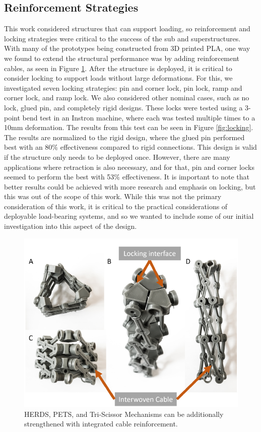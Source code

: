 \documentclass[11pt, a4paper]{article}
\begin{document}
\subsection{Reinforcement Strategies}
This work considered structures that can support loading, so reinforcement and locking strategies were critical to the success of the sub and superstructures. With many of the prototypes being constructed from 3D printed PLA, one way we found to extend the structural performance was by adding reinforcement cables, as seen in Figure \ref{fig:cable-reinforcing}. After the structure is deployed, it is critical to consider locking to support loads without large deformations. For this, we investigated seven locking strategies: pin and corner lock, pin lock, ramp and corner lock, and ramp lock. We also considered other nominal cases, such as no lock, glued pin, and completely rigid designs. These locks were tested using a 3-point bend test in an Instron machine, where each was tested multiple times to a 10mm deformation. The results from this test can be seen in Figure \ref{fig:locking}. The results are normalized to the rigid design, where the glued pin performed best with an 80\% effectiveness compared to rigid connections. This design is valid if the structure only needs to be deployed once. However, there are many applications where retraction is also necessary, and for that, pin and corner locks seemed to perform the best with 53\% effectiveness. It is important to note that better results could be achieved with more research and emphasis on locking, but this was out of the scope of this work. While this was not the primary consideration of this work, it is critical to the practical considerations of deployable load-bearing systems, and so we wanted to include some of our initial investigation into this aspect of the design. 


\begin{figure}
\centering
\includegraphics[width=\linewidth]{figures-sup/cable reinforced scissor.png}
\centering
\caption{HERDS, PETS, and Tri-Scissor Mechanisms can be additionally strengthened with integrated cable reinforcement.}
\label{fig:cable-reinforcing}
\end{figure}
\end{document}
